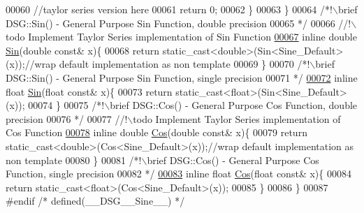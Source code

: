 \begin{DoxyCode}
00060             \textcolor{comment}{//taylor series version here}
00061             \textcolor{keywordflow}{return} 0;
00062         \}
00063     \}\textcolor{comment}{}
00064 \textcolor{comment}{    /*!\(\backslash\)brief DSG::Sin() - General Purpose Sin Function, double precision}
00065 \textcolor{comment}{     */}\textcolor{comment}{}
00066 \textcolor{comment}{    //!\(\backslash\)todo Implement Taylor Series implementation of Sin Function}
\hypertarget{_sine_8h_source_l00067}{}\hyperlink{namespace_d_s_g_aad63d316081c7d13a551acf346ee2749}{00067} \textcolor{comment}{}    \textcolor{keyword}{inline} \textcolor{keywordtype}{double} \hyperlink{namespace_d_s_g_aad63d316081c7d13a551acf346ee2749}{Sin}(\textcolor{keywordtype}{double} \textcolor{keyword}{const}& x)\{
00068         \textcolor{keywordflow}{return} \textcolor{keyword}{static\_cast<}\textcolor{keywordtype}{double}\textcolor{keyword}{>}(Sin<Sine\_Default>(x));\textcolor{comment}{//wrap default implementation as non template}
00069     \}\textcolor{comment}{}
00070 \textcolor{comment}{    /*!\(\backslash\)brief DSG::Sin() - General Purpose Sin Function, single precision}
00071 \textcolor{comment}{     */}
\hypertarget{_sine_8h_source_l00072}{}\hyperlink{namespace_d_s_g_aa2f9baa8896fff266c5e7ee73fb5c3d5}{00072}     \textcolor{keyword}{inline} \textcolor{keywordtype}{float} \hyperlink{namespace_d_s_g_aad63d316081c7d13a551acf346ee2749}{Sin}(\textcolor{keywordtype}{float} \textcolor{keyword}{const}& x)\{
00073         \textcolor{keywordflow}{return} \textcolor{keyword}{static\_cast<}\textcolor{keywordtype}{float}\textcolor{keyword}{>}(Sin<Sine\_Default>(x));
00074     \}\textcolor{comment}{}
00075 \textcolor{comment}{    /*!\(\backslash\)brief DSG::Cos() - General Purpose Cos Function, double precision}
00076 \textcolor{comment}{     */}\textcolor{comment}{}
00077 \textcolor{comment}{    //!\(\backslash\)todo Implement Taylor Series implementation of Cos Function}
\hypertarget{_sine_8h_source_l00078}{}\hyperlink{namespace_d_s_g_ade303ad15c77f534429305c3cbd90191}{00078} \textcolor{comment}{}    \textcolor{keyword}{inline} \textcolor{keywordtype}{double} \hyperlink{namespace_d_s_g_ade303ad15c77f534429305c3cbd90191}{Cos}(\textcolor{keywordtype}{double} \textcolor{keyword}{const}& x)\{
00079         \textcolor{keywordflow}{return} \textcolor{keyword}{static\_cast<}\textcolor{keywordtype}{double}\textcolor{keyword}{>}(Cos<Sine\_Default>(x));\textcolor{comment}{//wrap default implementation as non template}
00080     \}\textcolor{comment}{}
00081 \textcolor{comment}{    /*!\(\backslash\)brief DSG::Cos() - General Purpose Cos Function, single precision}
00082 \textcolor{comment}{     */}
\hypertarget{_sine_8h_source_l00083}{}\hyperlink{namespace_d_s_g_a214b00c1735dd1976757f284dfe6fb1f}{00083}     \textcolor{keyword}{inline} \textcolor{keywordtype}{float} \hyperlink{namespace_d_s_g_ade303ad15c77f534429305c3cbd90191}{Cos}(\textcolor{keywordtype}{float} \textcolor{keyword}{const}& x)\{
00084         \textcolor{keywordflow}{return} \textcolor{keyword}{static\_cast<}\textcolor{keywordtype}{float}\textcolor{keyword}{>}(Cos<Sine\_Default>(x));
00085     \}
00086 \}
00087 \textcolor{preprocessor}{#endif }\textcolor{comment}{/* defined(\_\_DSG\_\_Sine\_\_) */}\textcolor{preprocessor}{}
\end{DoxyCode}
